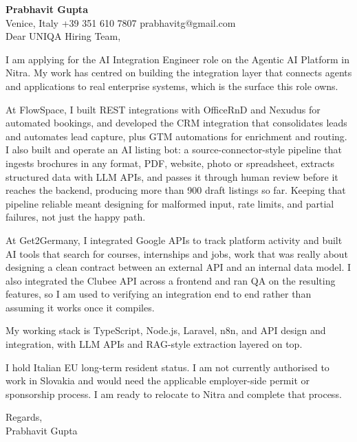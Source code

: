\documentclass[a4paper,10.5pt]{article}
\begin{document}
\textbf{Prabhavit Gupta}\\
Venice, Italy \textbar{} +39 351 610 7807 \textbar{} prabhavitg@gmail.com\\[10pt]
Dear UNIQA Hiring Team,

I am applying for the AI Integration Engineer role on the Agentic AI Platform in Nitra. My work has centred on building the integration layer that connects agents and applications to real enterprise systems, which is the surface this role owns.

At FlowSpace, I built REST integrations with OfficeRnD and Nexudus for automated bookings, and developed the CRM integration that consolidates leads and automates lead capture, plus GTM automations for enrichment and routing. I also built and operate an AI listing bot: a source-connector-style pipeline that ingests brochures in any format, PDF, website, photo or spreadsheet, extracts structured data with LLM APIs, and passes it through human review before it reaches the backend, producing more than 900 draft listings so far. Keeping that pipeline reliable meant designing for malformed input, rate limits, and partial failures, not just the happy path.

At Get2Germany, I integrated Google APIs to track platform activity and built AI tools that search for courses, internships and jobs, work that was really about designing a clean contract between an external API and an internal data model. I also integrated the Clubee API across a frontend and ran QA on the resulting features, so I am used to verifying an integration end to end rather than assuming it works once it compiles.

My working stack is TypeScript, Node.js, Laravel, n8n, and API design and integration, with LLM APIs and RAG-style extraction layered on top.

I hold Italian EU long-term resident status. I am not currently authorised to work in Slovakia and would need the applicable employer-side permit or sponsorship process. I am ready to relocate to Nitra and complete that process.

Regards,\\
Prabhavit Gupta
\end{document}
